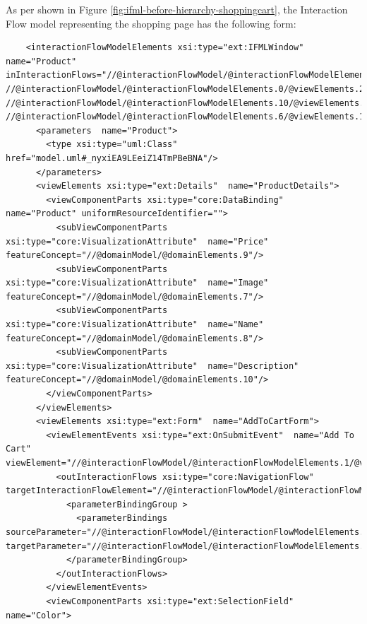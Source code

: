 \newpage
As per shown in Figure \ref{fig:ifml-before-hierarchy-shoppingcart}, the Interaction Flow model representing the shopping page has the following form:

\lstset{language=XML}
\begin{lstlisting} 
    <interactionFlowModelElements xsi:type="ext:IFMLWindow"  name="Product" inInteractionFlows="//@interactionFlowModel/@interactionFlowModelElements.1/@viewElements.2/@viewElementEvents.0/@outInteractionFlows.0 //@interactionFlowModel/@interactionFlowModelElements.0/@viewElements.2/@viewElementEvents.0/@outInteractionFlows.0 //@interactionFlowModel/@interactionFlowModelElements.10/@viewElements.0/@viewElementEvents.0/@outInteractionFlows.0 //@interactionFlowModel/@interactionFlowModelElements.6/@viewElements.1/@viewElements.0/@viewElementEvents.0/@outInteractionFlows.0">
      <parameters  name="Product">
        <type xsi:type="uml:Class" href="model.uml#_nyxiEA9LEeiZ14TmPBeBNA"/>
      </parameters>
      <viewElements xsi:type="ext:Details"  name="ProductDetails">
        <viewComponentParts xsi:type="core:DataBinding"  name="Product" uniformResourceIdentifier="">
          <subViewComponentParts xsi:type="core:VisualizationAttribute"  name="Price" featureConcept="//@domainModel/@domainElements.9"/>
          <subViewComponentParts xsi:type="core:VisualizationAttribute"  name="Image" featureConcept="//@domainModel/@domainElements.7"/>
          <subViewComponentParts xsi:type="core:VisualizationAttribute"  name="Name" featureConcept="//@domainModel/@domainElements.8"/>
          <subViewComponentParts xsi:type="core:VisualizationAttribute"  name="Description" featureConcept="//@domainModel/@domainElements.10"/>
        </viewComponentParts>
      </viewElements>
      <viewElements xsi:type="ext:Form"  name="AddToCartForm">
        <viewElementEvents xsi:type="ext:OnSubmitEvent"  name="Add To Cart" viewElement="//@interactionFlowModel/@interactionFlowModelElements.1/@viewElements.1">
          <outInteractionFlows xsi:type="core:NavigationFlow"  targetInteractionFlowElement="//@interactionFlowModel/@interactionFlowModelElements.9">
            <parameterBindingGroup >
              <parameterBindings  sourceParameter="//@interactionFlowModel/@interactionFlowModelElements.1/@viewElements.1/@viewComponentParts.2" targetParameter="//@interactionFlowModel/@interactionFlowModelElements.1/@viewElements.1/@viewComponentParts.2"/>
            </parameterBindingGroup>
          </outInteractionFlows>
        </viewElementEvents>
        <viewComponentParts xsi:type="ext:SelectionField"  name="Color">

\end{lstlisting}
